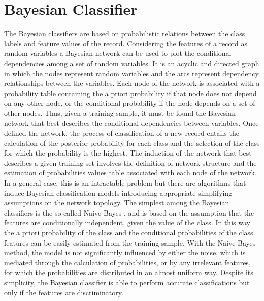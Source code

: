 \documentclass[final,a4paper,12pt,english]{UnicaPhdThesis3}
\begin{document}
\section{Bayesian Classifier} \label{NB}
The Bayesian classifiers are based on probabilistic relations between the class labels and feature values of the record. Considering the features of a record as random variables a Bayesian network can be used to plot the conditional dependencies among a set of random variables. It is an acyclic and directed graph in which the nodes represent random variables and the arcs represent dependency relationships between the variables. Each node of the network is associated with a probability table containing the a priori probability if that node does not depend on any other node, or the conditional probability if the node depends on a set of other nodes. Thus, given a training sample, it must be found the Bayesian network that best describes the conditional dependencies between variables. Once defined the network, the process of classification of a new record entails the calculation of the posterior probability for each class and the selection of the class for which the probability is the highest. The induction of the network that best describes a given training set involves the definition of network structure and the estimation of probabilities values table associated with each node of the network. In a general case, this is an intractable problem but there are algorithms that induce Bayesian classification models introducing appropriate simplifying assumptions on the network topology. The simplest among the Bayesian classifiers is the so-called Naive Bayes  \cite{Duda}, \cite{Langley} and is based on the assumption that the features are conditionally independent, given the value of the class. In this way the a priori probability of the class and the conditional probabilities of the class features can be easily estimated from the training sample. With the Naive Bayes method, the model is not significantly influenced by either the noise, which is mediated through the calculation of probabilities, or by any irrelevant features, for which the probabilities are distributed in an almost uniform way. Despite its simplicity, the Bayesian classifier is able to perform accurate classifications but only if the features are discriminatory.
\end{document}
